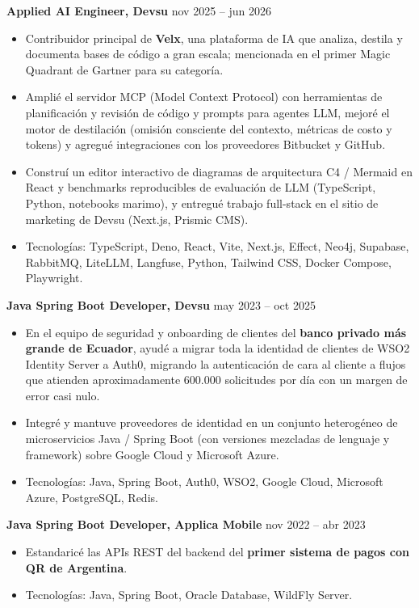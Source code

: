\documentclass[10pt, a4paper]{article}
\begin{document}
\textbf{Applied AI Engineer, Devsu} \hfill nov 2025 -- jun 2026
\begin{itemize}[leftmargin=10pt, noitemsep]
    \item Contribuidor principal de \textbf{Velx}, una plataforma de IA que analiza, destila y documenta bases de código a gran escala; mencionada en el primer Magic Quadrant de Gartner para su categoría.
    \item Amplié el servidor MCP (Model Context Protocol) con herramientas de planificación y revisión de código y prompts para agentes LLM, mejoré el motor de destilación (omisión consciente del contexto, métricas de costo y tokens) y agregué integraciones con los proveedores Bitbucket y GitHub.
    \item Construí un editor interactivo de diagramas de arquitectura C4 / Mermaid en React y benchmarks reproducibles de evaluación de LLM (TypeScript, Python, notebooks marimo), y entregué trabajo full-stack en el sitio de marketing de Devsu (Next.js, Prismic CMS).
    \item Tecnologías: TypeScript, Deno, React, Vite, Next.js, Effect, Neo4j, Supabase, RabbitMQ, LiteLLM, Langfuse, Python, Tailwind CSS, Docker Compose, Playwright.
\end{itemize}

\textbf{Java Spring Boot Developer, Devsu} \hfill may 2023 -- oct 2025
\begin{itemize}[leftmargin=10pt, noitemsep]
    \item En el equipo de seguridad y onboarding de clientes del \textbf{banco privado más grande de Ecuador}, ayudé a migrar toda la identidad de clientes de WSO2 Identity Server a Auth0, migrando la autenticación de cara al cliente a flujos que atienden aproximadamente 600.000 solicitudes por día con un margen de error casi nulo.
    \item Integré y mantuve proveedores de identidad en un conjunto heterogéneo de microservicios Java / Spring Boot (con versiones mezcladas de lenguaje y framework) sobre Google Cloud y Microsoft Azure.
    \item Tecnologías: Java, Spring Boot, Auth0, WSO2, Google Cloud, Microsoft Azure, PostgreSQL, Redis.
\end{itemize}

\textbf{Java Spring Boot Developer, Applica Mobile} \hfill nov 2022 -- abr 2023
\begin{itemize}[leftmargin=10pt, noitemsep]
    \item Estandaricé las APIs REST del backend del \textbf{primer sistema de pagos con QR de Argentina}.
    \item Tecnologías: Java, Spring Boot, Oracle Database, WildFly Server.
\end{itemize}
\end{document}
